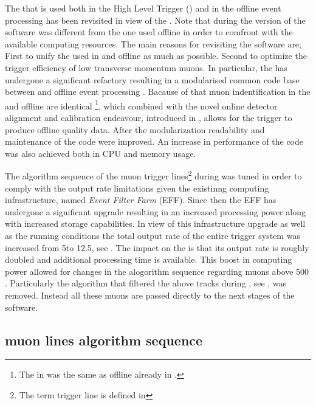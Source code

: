 
The \muonID \cite{LHCb-PUB-2009-013,LHCb-PUB-2010-002} that is used both in the High Level Trigger (\hlt) \cite{LHCb-PUB-2011-017}
and in the offline event processing has been revisited in view of the \lhc \runtwo.
Note that during \runone the \hlt version of the \muonID software was different from the one used offline in order
to comfront with the available computing resources. The main reasons for revisiting the software are;
First to unify the \muonID used in \hlt and offline as much as possible.
Second to optimize the trigger efficiency of low transverse momentum muons.
In particular, the \muonID has undergone a significant refactory resulting in a modularised common code base
between \hlt and offline event processing \cite{kevinThesis}. Bacause of that
muon indentification in the \hltone and offline are identical \footnote{The \muonID in \hlttwo was the same as offline already in \runone.},
which combined with the novel online detector alignment and calibration endeavour, introduced in , allows for the trigger
to produce offline quality data. After the modularization readability and maintenance of the code were improved.
An increase in performance of the \muonID code was also achieved both in CPU and memory usage.

The algorithm sequence of the \hltone muon trigger lines\footnote{The term trigger line is defined in }
during \runone was tuned in order to comply with the output rate limitations given the existinng computing infrastructure,
named {\it Event Filter Farm} (EFF). Since then the EFF has undergone a significant upgrade resulting in an
increased processing power along with increased storage capabilities. In view of this infrastructure upgrade
as well as the \runtwo \lhc running conditions the total output rate of the entire trigger system was increased
from 5\khz to 12.5\khz, see . The impact on the \hltone is that its output rate is
roughly doubled and additional processing time is available. This boost in computing power allowed for changes
in the \muonID alogorithm sequence regarding muons above 500 \mevc. Particularly the \mvm algorithm that filtered
the above tracks during \runone, see , was removed.
Instead all these muons are passed directly to the next stages of the \muonID software.

\subsection{\hltone muon lines algorithm sequence}
\label{hlt1run2}

